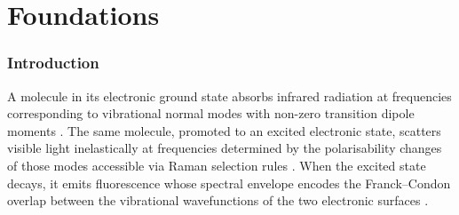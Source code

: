 \documentclass[11pt,a4paper]{article}
\theoremstyle{definition}
\theoremstyle{remark}
\begin{document}
\begin{abstract}
Validation on CH$_4^+$ ($T_d$ symmetry, 4 fundamental modes) achieves 99.5\% cross-prediction accuracy between Raman and IR, mutual exclusion violation $V_{\mathrm{ME}} = 0.000$, and ternary trajectory fidelity $F = 0.983$. Validation on Rhodamine~6G reproduces Stokes shift ($1011~\mathrm{cm}^{-1}$ predicted vs $1015 \pm 10$ measured), reorganisation energy ($506~\mathrm{cm}^{-1}$ vs $510 \pm 20$), Huang--Rhys factor $S_{\mathrm{CO}} = 0.4$ vs $0.38 \pm 0.05$, and confirms $C_2$ point group symmetry from diffraction.

\medskip
\noindent\textbf{Keywords:} spectral holography, emission-strobed spectroscopy, three-state superposition, S-entropy coordinates, ternary state tomography, Franck--Condon extraction, Stokes shift decomposition, Huang--Rhys factors, molecular diffraction, autocatalytic measurement, GPU categorical instrument, empty dictionary principle
\end{abstract}

\tableofcontents
\newpage


\part{Foundations}

\section{Introduction}
\label{sec:introduction}

A molecule in its electronic ground state absorbs infrared radiation at frequencies corresponding to vibrational normal modes with non-zero transition dipole moments \citep{herzberg1945}. The same molecule, promoted to an excited electronic state, scatters visible light inelastically at frequencies determined by the polarisability changes of those modes accessible via Raman selection rules \citep{raman1928, long2002}. When the excited state decays, it emits fluorescence whose spectral envelope encodes the Franck--Condon overlap between the vibrational wavefunctions of the two electronic surfaces \citep{franck1926, condon1928}.
\end{document}
